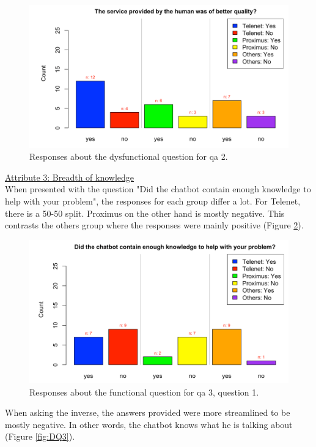 \begin{figure}[!htb]
	\includegraphics[width=\linewidth, scale=0.5]{../LaTeX/Figures/Comparative/DQ2.png}
	\caption{Responses about the dysfunctional question for \acrshort{qa} 2.}\label{fig:DQ2}
\end{figure}
\break
\ul{Attribute 3: Breadth of knowledge}\\
\break
When presented with the question "Did the chatbot contain enough knowledge to help with your problem", the responses for each group differ a lot. For Telenet, there is a 50-50 split. Proximus on the other hand is mostly negative. This contrasts the others group where the responses were mainly positive (Figure \ref{fig:Q3}).\\
\begin{figure}[!htb]
	\includegraphics[width=\linewidth, scale=0.5]{../LaTeX/Figures/Comparative/Q3.png}
	\caption{Responses about the functional question for \acrshort{qa} 3, question 1.}\label{fig:Q3}
\end{figure}
When asking the inverse, the answers provided were more streamlined to be mostly negative. In other words, the chatbot knows what he is talking about (Figure \ref{fig:DQ3}).\\
